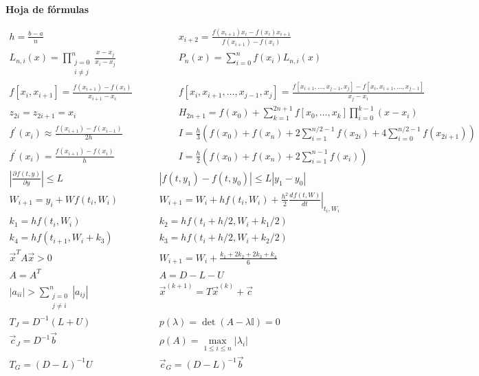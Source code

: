 \documentclass[12pt]{article}
\newcommand{\I}{\ensuremath{\mathbb{I}}}
\newcommand{\diff}[3]{\frac{d^{#3} #1}{d#2^{#3}}}
\newcommand{\pdiff}[3]{\frac{\partial^{#3} #1}{\partial #2^{#3}}}
\newcommand{\abs}[1]{\left| #1 \right|}
\begin{document}
\clearpage
\begin{center}
\textbf{Hoja de fórmulas}
\end{center}
{\large
\[
\begin{array}{cc}
h = \frac{b - a}{n} \qquad & \qquad
x_{i+2} = \frac{f(x_{i+1}){x_i}-f(x_{i}){x_{i+1}}}{f(x_{i+1}) - f(x_i)} \\
L_{n, i}(x) = \prod\limits_{\substack{j=0\\ i \neq j}}^n \frac{x - x_j}{x_i - x_j} \qquad & \qquad
P_n(x) = \sum\limits_{i = 0}^n f(x_i)L_{n,i}(x) \\
f\left[x_i, x_{i+1}\right] = \frac{f(x_{i+1})-f(x_i)}{x_{i+1}-x_i} \qquad & \qquad
f\left[ x_i, x_{i+1}, \ldots, x_{j-1}, x_j\right] = \frac{f\left[x_{i+1}, \ldots, x_{j-1}, x_j\right] - f\left[ x_i, x_{i+1}, \ldots, x_{j-1} \right]}{x_j - x_i} \\
z_{2i} = z_{2i+1} = x_i \qquad & \qquad
H_{2n+1} = f(x_0) + \sum\limits_{k=1}^{2n+1} f\left[x_0, \ldots, x_k\right] \prod\limits_{i = 0}^{k-1}(x-x_i)  \\
f^\prime(x_i) \approx \frac{f(x_{i+1}) - f(x_{i-1})}{2h} \qquad & \qquad
I = \frac{h}{3}\left( f(x_0) + f(x_n) + 2\sum\limits_{i=1}^{n/2-1}f(x_{2i}) + 4\sum\limits_{i=0}^{n/2-1}f(x_{2i+1}) \right) \\
f^\prime(x_i) = \frac{f(x_{i+1})-f(x_i)}{h} \qquad & \qquad
I = \frac{h}{2}\left( f(x_0) + f(x_n) + 2\sum\limits_{i = 1}^{n-1}f(x_i)\right) \\
\abs{\pdiff{f(t,y)}{y}{}} \leq L & \abs{f(t, y_1) -f(t, y_0)} \leq L\abs{y_1 - y_0}\\
W_{i+1} = y_i + W f(t_i,W_i) & W_{i+1} = W_i + h f(t_i,W_i) + \frac{h^2}{2} \left.\diff{f(t,W)}{t}{} \right|_{t_i, W_i} \\
k_1  =  h f(t_i,W_i) & k_2  =  h f(t_i+h/2,W_i + k_1/2) \\
k_4  =  h f(t_{i+1},W_i + k_3) & k_3  =  h f(t_i+h/2,W_i + k_2/2)\\
\vec{x}^TA\vec{x} > 0 & W_{i+1} = W_i + \frac{k_1+2k_2+2k_3+k_4}{6}\\
A = A^T & A = D - L - U\\
|a_{ii}| > \sum\limits_{\substack{j=0\\j\neq i}}^n |a_{ij}| & \vec{x}^{(k+1)} = T\vec{x}^{(k)} + \vec{c}\\
T_J = D^{-1}(L+U) & p(\lambda) = \det(A-\lambda \I) = 0\\
\vec{c}_J = D^{-1}\vec{b} & \rho(A) = \max\limits_{1\leq i\leq n}|\lambda_i|\\
T_G = (D-L)^{-1}U & \vec{c}_G = (D-L)^{-1}\vec{b}
\end{array}
\]
}
\end{document}
